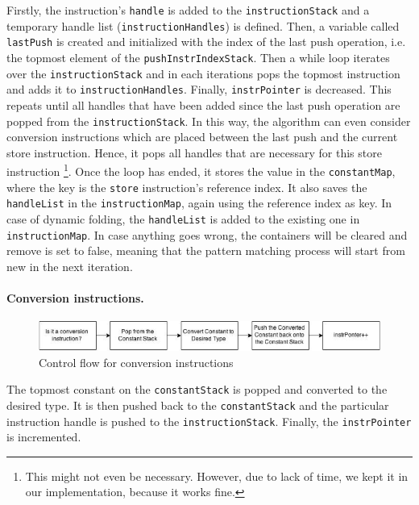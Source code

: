 Firstly, the instruction’s \texttt{handle} is added to the \texttt{instructionStack} and a temporary handle list (\texttt{instructionHandles}) is defined. Then, a variable called \texttt{lastPush} is created and initialized with the index of the last push operation, i.e. the topmost element of the \texttt{pushInstrIndexStack}. Then a while loop iterates over the \texttt{instructionStack} and in each iterations pops the topmost instruction and adds it to \texttt{instructionHandles}. Finally, \texttt{instrPointer} is decreased. This repeats until all handles that have been added since the last push operation are popped from the \texttt{instructionStack}. 
In this way, the algorithm can even consider conversion instructions which are placed between the last push and the current store instruction. Hence, it pops all handles that are necessary for this store instruction \footnote{This might not even be necessary. However, due to lack of time, we kept it in our implementation, because it works fine.}. Once the loop has ended, it stores the value in the \texttt{constantMap}, where the key is the \texttt{store} instruction’s reference index. It also saves the \texttt{handleList} in the \texttt{instructionMap}, again using the reference index as key. In case of dynamic folding, the \texttt{handleList} is added to the existing one in \texttt{instructionMap}. In case anything goes wrong, the containers will be cleared and remove is set to false, meaning that the pattern matching process will start from new in the next iteration.


\paragraph{Conversion instructions.}
\begin{figure}[h!]
\centering
\includegraphics[scale=0.6]{figures/conversion}
\caption{Control flow for conversion instructions}
\end{figure}

The topmost constant on the \texttt{constantStack} is popped and converted to the desired type. It is then pushed back to the \texttt{constantStack} and the particular instruction handle is pushed to the \texttt{instructionStack}. Finally, the \texttt{instrPointer} is incremented. 

